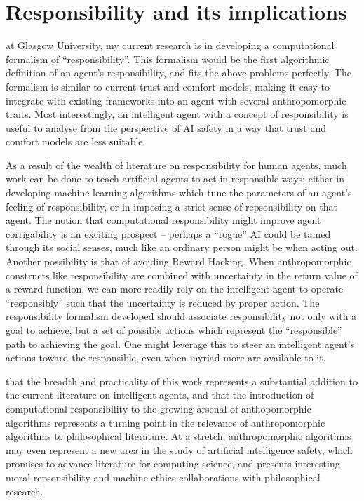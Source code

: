 \section{Responsibility and its implications}
 at Glasgow University, my current research is in developing a computational formalism of ``responsibility''. This formalism would be the first algorithmic definition of an agent's responsibility, and fits the above problems perfectly. The formalism is similar to current trust and comfort models, making it easy to integrate with existing frameworks into an agent with several anthropomorphic traits. Most interestingly, an intelligent agent with a concept of responsibility is useful to analyse from the perspective of AI safety in a way that trust and comfort models are less suitable.\par

As a result of the wealth of literature on responsibility for human agents, much work can be done to teach artificial agents to act in responsible ways; either in developing machine learning algorithms which tune the parameters of an agent's feeling of responsibility, or in imposing a strict sense of repsonsibility on that agent. The notion that computational responsibility might improve agent corrigability\cite{corrigability} is an exciting prospect -- perhaps a ``rogue'' AI could be tamed through its social senses, much like an ordinary person might be when acting out. Another possibility is that of avoiding Reward Hacking\cite{concrete_problems}. When anthropomorphic constructs like responsibility are combined with uncertainty in the return value of a reward function, we can more readily rely on the intelligent agent to operate ``responsibly'' such that the uncertainty is reduced by proper action. The responsibility formalism developed should associate responsibility not only with a goal to achieve, but a set of possible actions which represent the ``responsible'' path to achieving the goal. One might leverage this to steer an intelligent agent's actions toward the responsible, even when myriad more are available to it.\par 

 that the breadth and practicality of this work represents a substantial addition to the current literature on intelligent agents, and that the introduction of computational responsibility to the growing arsenal of anthopomorphic algorithms represents a turning point in the relevance of anthropomorphic algorithms to philosophical literature. At a stretch, anthropomorphic algorithms may even represent a new area in the study of artificial intelligence safety, which promises to advance literature for computing science, and presents interesting moral repsonsibility and machine ethics collaborations with philosophical research.

